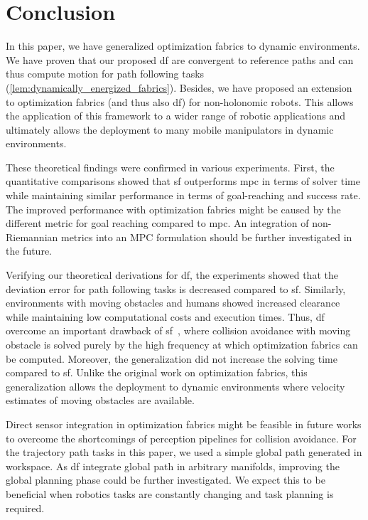 \section{Conclusion}%
\label{sec:tro23_conclusion}

In this paper, we have generalized optimization fabrics to dynamic
environments. We have proven that our proposed \acl{df} are convergent to
reference paths and can thus compute motion for path following tasks
(\cref{lem:dynamically_energized_fabrics}). Besides, we have proposed an
extension to optimization fabrics (and thus also \ac{df}) for
non\hyp{}holonomic robots. This allows the application of this framework to a wider
range of robotic applications and ultimately allows the deployment to many
mobile manipulators in dynamic environments.

These theoretical findings were confirmed in various experiments. First, the
quantitative comparisons showed that \acl{sf} outperforms \ac{mpc} in terms of
solver time while maintaining similar performance in terms of goal-reaching and
success rate. 
The improved performance with optimization fabrics might be caused
by the different metric for goal
reaching compared to \acl{mpc}. An integration of
non-Riemannian metrics into an MPC formulation should be further
investigated in the future.

Verifying our theoretical derivations for \ac{df}, the experiments
showed that the deviation error for path following tasks is decreased compared
to \ac{sf}. Similarly, environments with moving obstacles and humans showed
increased clearance while maintaining low computational costs and execution
times. Thus, \ac{df} overcome an important drawback of
\ac{sf}~\cite{Ratliff2020,Wyk2022}, where collision avoidance with moving
obstacle is solved purely by the high frequency at which optimization fabrics
can be computed. Moreover, the generalization did not increase the solving time
compared to \ac{sf}. Unlike the original work on optimization fabrics, this
generalization allows the deployment to dynamic environments where velocity
estimates of moving obstacles are available.

Direct sensor integration in optimization fabrics might be feasible in future
works to overcome the shortcomings of perception pipelines for collision
avoidance. For the trajectory path tasks in this paper, we
used a simple global path generated in workspace. As \ac{df} integrate
global path in arbitrary manifolds, improving the global planning phase could
be further investigated. We expect this to be beneficial when robotics tasks
are constantly changing and task planning is required.
